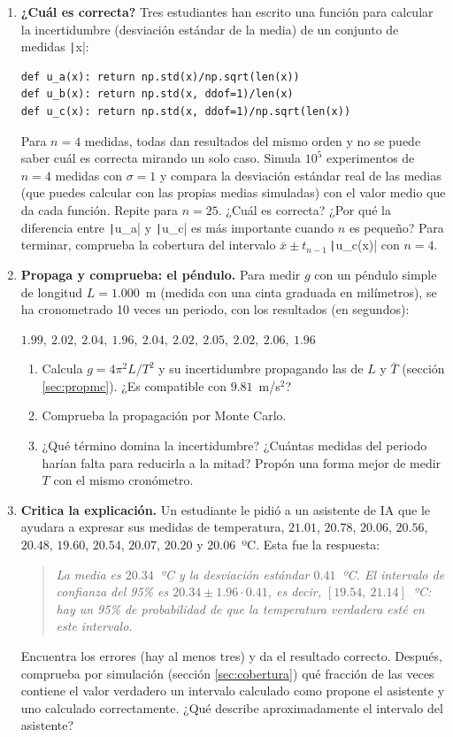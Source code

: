 \begin{enumerate}
\item \label{ej:cual_incertidumbre} \textbf{¿Cuál es correcta?} Tres estudiantes han escrito una función para calcular la incertidumbre (desviación estándar de la media) de un conjunto de medidas \texttt|x|:
\begin{verbatim}
def u_a(x): return np.std(x)/np.sqrt(len(x))
def u_b(x): return np.std(x, ddof=1)/len(x)
def u_c(x): return np.std(x, ddof=1)/np.sqrt(len(x))
\end{verbatim}
Para $n=4$ medidas, todas dan resultados del mismo orden y no se puede saber cuál es correcta mirando un solo caso. Simula $10^5$ experimentos de $n=4$ medidas con $\sigma=1$ y compara la desviación estándar real de las medias (que puedes calcular con las propias medias simuladas) con el valor medio que da cada función. Repite para $n=25$. ¿Cuál es correcta? ¿Por qué la diferencia entre \texttt|u_a| y \texttt|u_c| es más importante cuando $n$ es pequeño? Para terminar, comprueba la cobertura del intervalo $\bar{x}\pm t_{n-1}\,$\texttt|u_c(x)| con $n=4$.

\item \label{ej:pendulo_prop} \textbf{Propaga y comprueba: el péndulo.} Para medir $g$ con un péndulo simple de longitud $L=1.000$~m (medida con una cinta graduada en milímetros), se ha cronometrado 10 veces un periodo, con los resultados (en segundos):
\begin{center}
$1.99,\ 2.02,\ 2.04,\ 1.96,\ 2.04,\ 2.02,\ 2.05,\ 2.02,\ 2.06,\ 1.96$
\end{center}
\begin{enumerate}
\item Calcula $g=4\pi^2L/T^2$ y su incertidumbre propagando las de $L$ y $\bar{T}$ (sección \ref{sec:propmc}). ¿Es compatible con $9.81$~m/s$^2$?
\item Comprueba la propagación por Monte Carlo.
\item ¿Qué término domina la incertidumbre? ¿Cuántas medidas del periodo harían falta para reducirla a la mitad? Propón una forma mejor de medir $T$ con el mismo cronómetro.
\end{enumerate}

\item \label{ej:ia_intervalo} \textbf{Critica la explicación.} Un estudiante le pidió a un asistente de IA que le ayudara a expresar sus medidas de temperatura, $21.01$, $20.78$, $20.06$, $20.56$, $20.48$, $19.60$, $20.54$, $20.07$, $20.20$ y $20.06$~ºC. Esta fue la respuesta:
\begin{quote}
\emph{La media es $20.34$~ºC y la desviación estándar $0.41$~ºC. El intervalo de confianza del 95\% es $20.34\pm1.96\cdot0.41$, es decir, $[19.54,\ 21.14]$~ºC: hay un 95\% de probabilidad de que la temperatura verdadera esté en este intervalo.}
\end{quote}
Encuentra los errores (hay al menos tres) y da el resultado correcto. Después, comprueba por simulación (sección \ref{sec:cobertura}) qué fracción de las veces contiene el valor verdadero un intervalo calculado como propone el asistente y uno calculado correctamente. ¿Qué describe aproximadamente el intervalo del asistente?


\end{enumerate}
